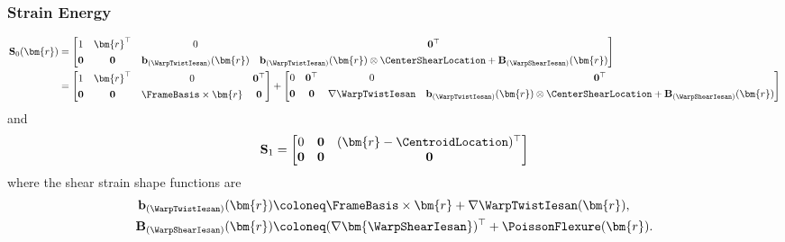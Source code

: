 \subsubsection{Strain Energy}


\begin{equation*}
\begin{aligned}
\mathbf{S}_0(\bm{r}) &= \begin{bmatrix}
1 & \bm{r}^\top & 0 & \mathbf{0}^\top \\[4pt]
\mathbf{0} & \mathbf{0} & \mathbf{b}_{(\WarpTwistIesan)}(\bm{r}) & 
\mathbf{b}_{(\WarpTwistIesan)}(\bm{r}) \otimes \CenterShearLocation + \mathbf{B}_{(\WarpShearIesan)}(\bm{r})
\end{bmatrix} \\
&= \begin{bmatrix}
1 & \bm{r}^\top & 0 & \mathbf{0}^\top \\[4pt]
\mathbf{0} & \mathbf{0} & \FrameBasis\times\bm{r} & 
\mathbf{0} %
\end{bmatrix} 
+\begin{bmatrix}
0 & \mathbf{0}^\top & 0 & \mathbf{0}^\top \\[4pt]
\mathbf{0} & \mathbf{0} & \nabla\WarpTwistIesan & 
\mathbf{b}_{(\WarpTwistIesan)}(\bm{r}) \otimes \CenterShearLocation + \mathbf{B}_{(\WarpShearIesan)}(\bm{r})
\end{bmatrix}
\end{aligned}
\end{equation*}
and
\begin{equation*}
\mathbf{S}_1 = \begin{bmatrix}
    0 & \mathbf{0} & (\bm{r} - \CentroidLocation)^\top \\ 
    \mathbf{0} & \mathbf{0} & \mathbf{0}
\end{bmatrix}
\end{equation*}
where the shear strain shape functions are
\begin{subequations}
\begin{align}
\mathbf{b}_{(\WarpTwistIesan)}(\bm{r}) &\coloneq \FrameBasis \times \bm{r} + \nabla\WarpTwistIesan(\bm{r}), 
\label{eq:tau-phi} \\
\mathbf{B}_{(\WarpShearIesan)}(\bm{r}) &\coloneq (\nabla\bm{\WarpShearIesan})^{\top} + \PoissonFlexure(\bm{r}).
\label{eq:tau-psi}
\end{align}
\end{subequations}

